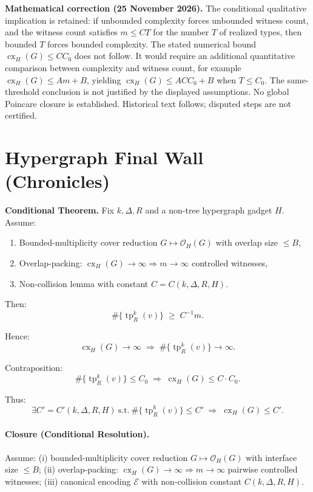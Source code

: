 \par\noindent\textbf{Mathematical correction (25 November 2026).} The conditional qualitative implication is retained: if unbounded complexity forces unbounded witness count, and the witness count satisfies $m\le C T$ for the number $T$ of realized types, then bounded $T$ forces bounded complexity. The stated numerical bound $\operatorname{cx}_H(G)\le CC_0$ does not follow. It would require an additional quantitative comparison between complexity and witness count, for example $\operatorname{cx}_H(G)\le A m+B$, yielding $\operatorname{cx}_H(G)\le AC C_0+B$ when $T\le C_0$. The same-threshold conclusion is not justified by the displayed assumptions. No global Poincare closure is established. Historical text follows; disputed steps are not certified.\par
\section{Hypergraph Final Wall (Chronicles)}

\textbf{Conditional Theorem.}
Fix $k,\Delta,R$ and a non-tree hypergraph gadget $H$. Assume:
\begin{enumerate}
\item Bounded-multiplicity cover reduction $G \mapsto \mathcal O_H(G)$ with overlap size $\le B$,
\item Overlap-packing: $\operatorname{cx}_H(G)\to\infty \Rightarrow m\to\infty$ controlled witnesses,
\item Non-collision lemma with constant $C=C(k,\Delta,R,H)$.
\end{enumerate}

Then:
\[
\#\{\operatorname{tp}^k_R(v)\} \;\ge\; C^{-1} m.
\]

Hence:
\[
\operatorname{cx}_H(G)\to\infty \;\Longrightarrow\; \#\{\operatorname{tp}^k_R(v)\}\to\infty.
\]

Contraposition:
\[
\#\{\operatorname{tp}^k_R(v)\}\le C_0
\;\Longrightarrow\;
\operatorname{cx}_H(G)\le C \cdot C_0.
\]

Thus:
\[
\exists C' = C'(k,\Delta,R,H)\ \text{s.t.}\ 
\#\{\operatorname{tp}^k_R(v)\}\le C'
\;\Longrightarrow\;
\operatorname{cx}_H(G)\le C'.
\]

\paragraph{Closure (Conditional Resolution).}
Assume:
(i) bounded-multiplicity cover reduction \(G\mapsto \mathcal O_H(G)\) with interface size \(\le B\);
(ii) overlap-packing: \(\operatorname{cx}_H(G)\to\infty \Rightarrow m\to\infty\) pairwise controlled witnesses;
(iii) canonical encoding \(\mathcal E\) with non-collision constant \(C(k,\Delta,R,H)\).

